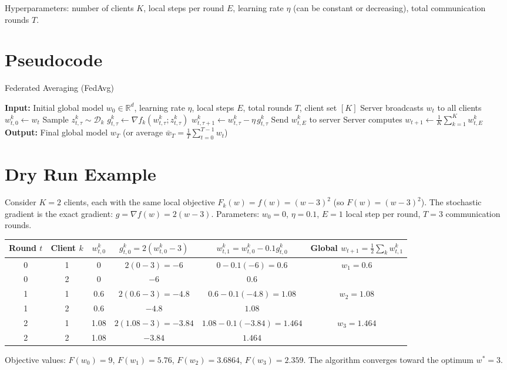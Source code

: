 \documentclass{article}
\begin{document}
Hyperparameters: number of clients $K$, local steps per round $E$, learning rate $\eta$ (can be constant or decreasing), total communication rounds $T$.

\section*{Pseudocode}
\begin{algorithm}[H]
\caption{Federated Averaging (FedAvg)}
\begin{algorithmic}[1]
\STATE \textbf{Input:} Initial global model $w_0 \in \mathbb{R}^d$, learning rate $\eta$, local steps $E$, total rounds $T$, client set $[K]$
    \STATE Server broadcasts $w_t$ to all clients
        \STATE $w_{t,0}^k \gets w_t$
            \STATE Sample $z_{t,\tau}^k \sim \mathcal{D}_k$
            \STATE $g_{t,\tau}^k \gets \nabla f_k(w_{t,\tau}^k; z_{t,\tau}^k)$
            \STATE $w_{t,\tau+1}^k \gets w_{t,\tau}^k - \eta \, g_{t,\tau}^k$
        \ENDFOR
        \STATE Send $w_{t,E}^k$ to server
    \ENDFOR
    \STATE Server computes $w_{t+1} \gets \frac{1}{K} \sum_{k=1}^K w_{t,E}^k$
\ENDFOR
\STATE \textbf{Output:} Final global model $w_T$ (or average $\bar{w}_T = \frac{1}{T}\sum_{t=0}^{T-1} w_t$)
\end{algorithmic}
\end{algorithm}

\section*{Dry Run Example}
Consider $K=2$ clients, each with the same local objective $F_k(w) = f(w) = (w-3)^2$ (so $F(w) = (w-3)^2$). The stochastic gradient is the exact gradient: $g = \nabla f(w) = 2(w-3)$. Parameters: $w_0 = 0$, $\eta = 0.1$, $E = 1$ local step per round, $T = 3$ communication rounds.

\begin{center}
\begin{tabular}{|c|c|c|c|c|c|}
\hline
Round $t$ & Client $k$ & $w_{t,0}^k$ & $g_{t,0}^k = 2(w_{t,0}^k-3)$ & $w_{t,1}^k = w_{t,0}^k - 0.1 g_{t,0}^k$ & Global $w_{t+1} = \frac{1}{2}\sum_k w_{t,1}^k$ \\ \hline
0 & 1 & 0 & $2(0-3) = -6$ & $0 - 0.1(-6) = 0.6$ & \multirow{2}{*}{$w_1 = 0.6$} \\
0 & 2 & 0 & $-6$ & $0.6$ & \\ \hline
1 & 1 & 0.6 & $2(0.6-3) = -4.8$ & $0.6 - 0.1(-4.8) = 1.08$ & \multirow{2}{*}{$w_2 = 1.08$} \\
1 & 2 & 0.6 & $-4.8$ & $1.08$ & \\ \hline
2 & 1 & 1.08 & $2(1.08-3) = -3.84$ & $1.08 - 0.1(-3.84) = 1.464$ & \multirow{2}{*}{$w_3 = 1.464$} \\
2 & 2 & 1.08 & $-3.84$ & $1.464$ & \\ \hline
\end{tabular}
\end{center}
Objective values: $F(w_0)=9$, $F(w_1)=5.76$, $F(w_2)=3.6864$, $F(w_3)=2.359$. The algorithm converges toward the optimum $w^*=3$.
\end{document}
